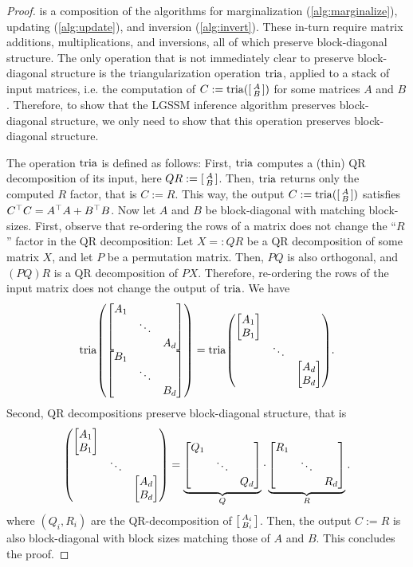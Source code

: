 \documentclass{mimosis}
\begin{document}
\begin{proof}
 is a composition of the algorithms for
marginalization (\cref{alg:marginalize}),
updating (\cref{alg:update}),
and inversion (\cref{alg:invert}).
These in-turn require matrix additions, multiplications, and inversions, all of which preserve block-diagonal structure.
The only operation that is not immediately clear to preserve block-diagonal structure is the triangularization operation \(\tria\), applied to a stack of input matrices, i.e. the computation of \(C := \tria( \smqty[ A \\ B] )\) for some matrices \(A\) and \(B\).
Therefore, to show that the LGSSM inference algorithm preserves block-diagonal structure, we only need to show that this operation preserves block-diagonal structure.

The operation \(\tria\) is defined as follows:
First, \(\tria\) computes a (thin) QR decomposition of its input, here \(QR := \smqty[ A \\ B]\). Then, \(\tria\) returns only the computed \(R\) factor, that is \(C := R\).
This way, the output \(C := \tria( \smqty[ A \\ B] )\) satisfies \(C^\top C = A^\top A + B^\top B\).
Now let \(A\) and \(B\) be block-diagonal with matching block-sizes.
First, observe that re-ordering the rows of a matrix does not change the ``\(R\)'' factor in the QR decomposition:
Let \(X =: QR\) be a QR decomposition of some matrix \(X\), and let \(P\) be a permutation matrix.
Then, \(PQ\) is also orthogonal, and \((PQ)R\) is a QR decomposition of \(PX\).
Therefore, re-ordering the rows of the input matrix does not change the output of \(\tria\).
We have
\begin{equation}
  \tria( \mqty{ \mqty[\dmat{A_1, \ddots, A_d}] \\ \mqty[\dmat{B_1, \ddots, B_d}] } )
  = \tria( \mqty{ \dmat{\mqty[A_1 \\ B_1], \ddots, \mqty[A_d \\ B_d]} }).
\end{equation}
Second, QR decompositions preserve block-diagonal structure, that is
\begin{equation}
  \mqty( \dmat{\mqty[A_1 \\ B_1], \ddots, \mqty[A_d \\ B_d]} )
  = \underbrace{\mqty[\dmat{Q_1, \ddots, Q_d}]}_Q \cdot \underbrace{\mqty[\dmat{R_1, \ddots, R_d}]}_{R}.
\end{equation}
where \((Q_i, R_i)\) are the QR-decomposition of \(\smqty[A_i \\ B_i]\).
Then, the output \(C:=R\) is also block-diagonal with block sizes matching those of \(A\) and \(B\).
This concludes the proof.
\end{proof}
\end{document}
